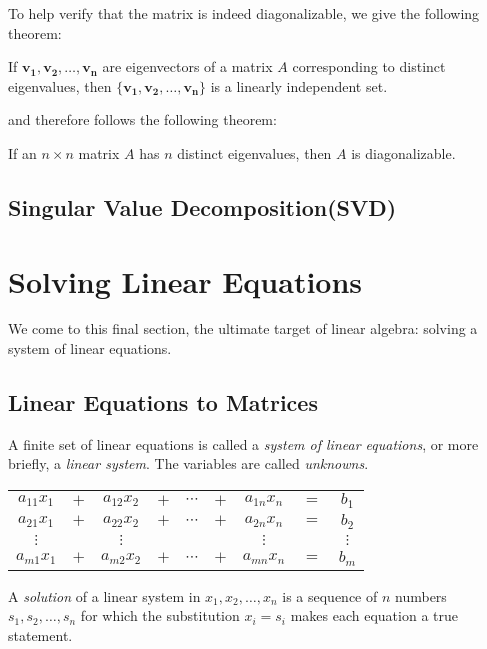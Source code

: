 \documentclass{report}
\begin{document}
			To help verify that the matrix is indeed diagonalizable, we give the following theorem:
			
			\begin{thm}
				If $\bm{v_1},\bm{v_2},\dots,\bm{v_n}$ are eigenvectors of a matrix $A$ corresponding to distinct eigenvalues, then $\{\bm{v_1},\bm{v_2},\dots,\bm{v_n}\}$ is a linearly independent set.
			\end{thm}
			
			and therefore follows the following theorem:
			
			\begin{thm}
				If an $n \times n$ matrix $A$ has $n$ distinct eigenvalues, then $A$ is diagonalizable.
			\end{thm}
		
		\subsection{Singular Value Decomposition(SVD)}%
	
	\section{Solving Linear Equations}
	We come to this final section, the ultimate target of linear algebra: solving a system of linear equations.
		\subsection{Linear Equations to Matrices}
		A finite set of linear equations is called a \emph{system of linear equations}, or more briefly, a \emph{linear system}. The variables are called \emph{unknowns}.
		
		\begin{center}
			\begin{tabular}{ccccccccc}
				$a_{11}x_1$ & $+$ & $a_{12}x_2$ & $+$ & $\cdots$ & $+$ & $a_{1n}x_n$ & $=$ & $b_1$    \\
				$a_{21}x_1$ & $+$ & $a_{22}x_2$ & $+$ & $\cdots$ & $+$ & $a_{2n}x_n$ & $=$ & $b_2$    \\
				$\vdots$    &     & $\vdots$   &     &          &     & $\vdots$    &     & $\vdots$ \\
				$a_{m1}x_1$ & $+$ & $a_{m2}x_2$ & $+$ & $\cdots$ & $+$ & $a_{mn}x_n$ & $=$ & $b_m$   
			\end{tabular}
		\end{center}
		
		A \emph{solution} of a linear system in $x_1,x_2,\dots,x_n$ is a sequence of $n$ numbers $s_1,s_2,\dots,s_n$ for which the substitution $x_i=s_i$ makes each equation a true statement.
		
\end{document}
